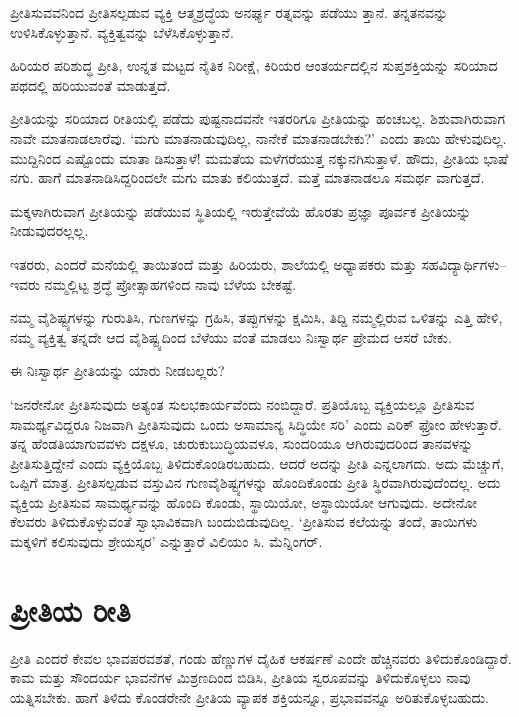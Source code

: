 ಪ್ರೀತಿಸುವವನಿಂದ ಪ್ರೀತಿಸಲ್ಪಡುವ ವ್ಯಕ್ತಿ ಆತ್ಮಶ್ರದ್ಧೆಯ ಅನರ್ಘ್ಯ ರತ್ನವನ್ನು ಪಡೆಯು ತ್ತಾನೆ. ತನ್ನತನವನ್ನು ಉಳಿಸಿಕೊಳ್ಳುತ್ತಾನೆ. ವ್ಯಕ್ತಿತ್ವವನ್ನು ಬೆಳೆಸಿಕೊಳ್ಳುತ್ತಾನೆ.

ಹಿರಿಯರ ಪರಿಶುದ್ಧ ಪ್ರೀತಿ, ಉನ್ನತ ಮಟ್ಟದ ನೈತಿಕ ನಿರೀಕ್ಷೆ, ಕಿರಿಯರ ಆಂತರ್ಯದಲ್ಲಿನ ಸುಪ್ತಶಕ್ತಿಯನ್ನು ಸರಿಯಾದ ಪಥದಲ್ಲಿ ಹರಿಯುವಂತೆ ಮಾಡುತ್ತದೆ.

ಪ್ರೀತಿಯನ್ನು ಸರಿಯಾದ ರೀತಿಯಲ್ಲಿ ಪಡೆದು ಪುಷ್ಟನಾದವನೇ ಇತರರಿಗೂ ಪ್ರೀತಿಯನ್ನು ಹಂಚಬಲ್ಲ. ಶಿಶುವಾಗಿರುವಾಗ ನಾವೇ ಮಾತನಾಡಲಾರೆವು. ‘ಮಗು ಮಾತನಾಡುವುದಿಲ್ಲ, ನಾನೇಕೆ ಮಾತನಾಡಬೇಕು?’ ಎಂದು ತಾಯಿ ಹೇಳುವುದಿಲ್ಲ. ಮುದ್ದಿನಿಂದ ಎಷ್ಟೊಂದು ಮಾತಾ ಡಿಸುತ್ತಾಳೆ! ಮಮತೆಯ ಮಳೆಗರೆಯುತ್ತ ನಕ್ಕುನಗಿಸುತ್ತಾಳೆ. ಹೌದು, ಪ್ರೀತಿಯ ಭಾಷೆ ನಗು. ಹಾಗೆ ಮಾತನಾಡಿಸಿದ್ದರಿಂದಲೇ ಮಗು ಮಾತು ಕಲಿಯುತ್ತದೆ. ಮತ್ತೆ ಮಾತನಾಡಲೂ ಸಮರ್ಥ ವಾಗುತ್ತದೆ.

ಮಕ್ಕಳಾಗಿರುವಾಗ ಪ್ರೀತಿಯನ್ನು ಪಡೆಯುವ ಸ್ಥಿತಿಯಲ್ಲಿ ಇರುತ್ತೇವೆಯೆ ಹೊರತು ಪ್ರಜ್ಞಾ ಪೂರ್ವಕ ಪ್ರೀತಿಯನ್ನು ನೀಡುವುದರಲ್ಲಲ್ಲ.

ಇತರರು, ಎಂದರೆ ಮನೆಯಲ್ಲಿ ತಾಯಿತಂದೆ ಮತ್ತು ಹಿರಿಯರು, ಶಾಲೆಯಲ್ಲಿ ಅಧ್ಯಾಪಕರು ಮತ್ತು ಸಹವಿದ್ಯಾರ್ಥಿಗಳು–ಇವರು ನಮ್ಮಲ್ಲಿಟ್ಟ ಶ್ರದ್ಧೆ ಪ್ರೋತ್ಸಾಹಗಳಿಂದ ನಾವು ಬೆಳೆಯ ಬೇಕಷ್ಟೆ.

ನಮ್ಮ ವೈಶಿಷ್ಟ್ಯಗಳನ್ನು ಗುರುತಿಸಿ, ಗುಣಗಳನ್ನು ಗ್ರಹಿಸಿ, ತಪ್ಪುಗಳನ್ನು ಕ್ಷಮಿಸಿ, ತಿದ್ದಿ ನಮ್ಮಲ್ಲಿರುವ ಒಳಿತನ್ನು ಎತ್ತಿ ಹೇಳಿ, ನಮ್ಮ ವ್ಯಕ್ತಿತ್ವ ತನ್ನದೇ ಆದ ವೈಶಿಷ್ಟ್ಯದಿಂದ ಬೆಳೆಯು ವಂತೆ ಮಾಡಲು ನಿಃಸ್ವಾರ್ಥ ಪ್ರೇಮದ ಆಸರೆ ಬೇಕು.

ಈ ನಿಃಸ್ವಾರ್ಥ ಪ್ರೀತಿಯನ್ನು ಯಾರು ನೀಡಬಲ್ಲರು?

‘ಜನರೇನೋ ಪ್ರೀತಿಸುವುದು ಅತ್ಯಂತ ಸುಲಭಕಾರ್ಯವೆಂದು ನಂಬಿದ್ದಾರೆ. ಪ್ರತಿಯೊಬ್ಬ ವ್ಯಕ್ತಿಯಲ್ಲೂ ಪ್ರೀತಿಸುವ ಸಾಮರ್ಥ್ಯವಿದ್ದರೂ ನಿಜವಾಗಿ ಪ್ರೀತಿಸುವುದು ಒಂದು ಅಸಾಮಾನ್ಯ ಸಿದ್ಧಿಯೇ ಸರಿ’ ಎಂದು ಎರಿಕ್ ಫ್ರೋಂ ಹೇಳುತ್ತಾರೆ. ತನ್ನ ಹೆಂಡತಿಯಾಗುವವಳು ದಕ್ಷಳೂ, ಚುರುಕುಬುದ್ಧಿಯವಳೂ, ಸುಂದರಿಯೂ ಆಗಿರುವುದರಿಂದ ತಾನವಳನ್ನು ಪ್ರೀತಿಸುತ್ತಿದ್ದೇನೆ ಎಂದು ವ್ಯಕ್ತಿಯೊಬ್ಬ ತಿಳಿದುಕೊಂಡಿರಬಹುದು. ಆದರೆ ಅದನ್ನು ಪ್ರೀತಿ ಎನ್ನಲಾಗದು. ಅದು ಮೆಚ್ಚುಗೆ, ಒಪ್ಪಿಗೆ ಮಾತ್ರ. ಪ್ರೀತಿಸಲ್ಪಡುವ ವಸ್ತುವಿನ ಗುಣವೈಶಿಷ್ಟ್ಯಗಳನ್ನು ಹೊಂದಿಕೊಂಡು ಪ್ರೀತಿ ಸ್ಥಿರವಾಗಿರುವುದೆಂದಲ್ಲ. ಅದು ವ್ಯಕ್ತಿಯ ಪ್ರೀತಿಸುವ ಸಾಮರ್ಥ್ಯವನ್ನು ಹೊಂದಿ ಕೊಂಡು, ಸ್ಥಾಯಿಯೋ, ಅಸ್ಥಾಯಿಯೋ ಆಗುವುದು. ಅದೇನೋ ಕೆಲವರು ತಿಳಿದುಕೊಳ್ಳುವಂತೆ ಸ್ವಾಭಾವಿಕವಾಗಿ ಬಂದುಬಿಡುವುದಿಲ್ಲ. ‘ಪ್ರೀತಿಸುವ ಕಲೆಯನ್ನು ತಂದೆ, ತಾಯಿಗಳು ಮಕ್ಕಳಿಗೆ ಕಲಿಸುವುದು ಶ್ರೇಯಸ್ಕರ’ ಎನ್ನುತ್ತಾರೆ ವಿಲಿಯಂ ಸಿ. ಮೆನ್ನಿಂಗರ್.


\section{ಪ್ರೀತಿಯ ರೀತಿ}

ಪ್ರೀತಿ ಎಂದರೆ ಕೇವಲ ಭಾವಪರವಶತೆ, ಗಂಡು ಹೆಣ್ಣುಗಳ ದೈಹಿಕ ಆಕರ್ಷಣೆ ಎಂದೇ ಹೆಚ್ಚಿನವರು ತಿಳಿದುಕೊಂಡಿದ್ದಾರೆ. ಕಾಮ ಮತ್ತು ಸೌಂದರ್ಯ ಭಾವನೆಗಳ ಮಿಶ್ರಣದಿಂದ ಬಿಡಿಸಿ, ಪ್ರೀತಿಯ ಸ್ವರೂಪವನ್ನು ತಿಳಿದುಕೊಳ್ಳಲು ನಾವು ಯತ್ನಿಸಬೇಕು. ಹಾಗೆ ತಿಳಿದು ಕೊಂಡರೇನೇ ಪ್ರೀತಿಯ ವ್ಯಾಪಕ ಶಕ್ತಿಯನ್ನೂ, ಪ್ರಭಾವವನ್ನೂ ಅರಿತುಕೊಳ್ಳಬಹುದು.

